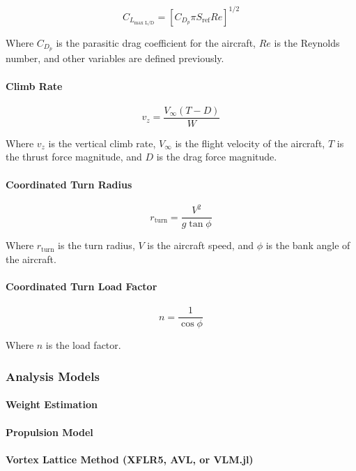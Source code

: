 \[C_{L_\text{max L/D}} = \left[ C_{D_p} \pi S_\text{ref} Re \right]^{1/2}\]

Where \(C_{D_p}\) is the parasitic drag coefficient for the aircraft, \(Re\) is the Reynolds number, and other variables are defined previously.


\paragraph{Climb Rate}

\[ v_z = \frac{V_\infty \left(T - D\right)}{W}\]

Where \(v_z\) is the vertical climb rate, \(V_\infty\) is the flight velocity of the aircraft, \(T\) is the thrust force magnitude, and \(D\) is the drag force magnitude.


\paragraph{Coordinated Turn Radius}

\[r_\text{turn} = \frac{V^2}{g \tan\phi}\]

Where \(r_\text{turn}\) is the turn radius, \(V\) is the aircraft speed, and \(\phi\) is the bank angle of the aircraft.

\paragraph{Coordinated Turn Load Factor}

\[n = \frac{1}{\cos\phi}\]

Where \(n\) is the load factor.

\subsubsection{Analysis Models}


\paragraph{Weight Estimation}


\paragraph{Propulsion Model}


\paragraph{Vortex Lattice Method (XFLR5, AVL, or VLM.jl)}


